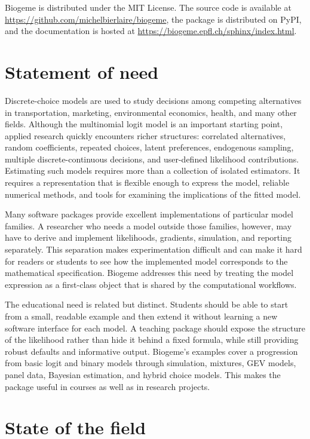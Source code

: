 \documentclass[11pt]{article}
\begin{document}
Biogeme is distributed under the MIT License. The source code is available at
\url{https://github.com/michelbierlaire/biogeme}, the package is distributed on
PyPI, and the documentation is hosted at
\url{https://biogeme.epfl.ch/sphinx/index.html}.

\section{Statement of need}

Discrete-choice models are used to study decisions among competing
alternatives in transportation, marketing, environmental economics, health,
and many other fields. Although the multinomial logit model is an important
starting point, applied research quickly encounters richer structures:
correlated alternatives, random coefficients, repeated choices, latent
preferences, endogenous sampling, multiple discrete-continuous decisions, and
user-defined likelihood contributions. Estimating such models requires more
than a collection of isolated estimators. It requires a representation that is
flexible enough to express the model, reliable numerical methods, and tools for
examining the implications of the fitted model.

Many software packages provide excellent implementations of particular model
families. A researcher who needs a model outside those families, however, may
have to derive and implement likelihoods, gradients, simulation, and reporting
separately. This separation makes experimentation difficult and can make it
hard for readers or students to see how the implemented model corresponds to
the mathematical specification. Biogeme addresses this need by treating the
model expression as a first-class object that is shared by the computational
workflows.

The educational need is related but distinct. Students should be able to start
from a small, readable example and then extend it without learning a new
software interface for each model. A teaching package should expose the
structure of the likelihood rather than hide it behind a fixed formula, while
still providing robust defaults and informative output. Biogeme's examples
cover a progression from basic logit and binary models through simulation,
mixtures, GEV models, panel data, Bayesian estimation, and hybrid choice
models. This makes the package useful in courses as well as in research
projects.

\section{State of the field}
\end{document}
